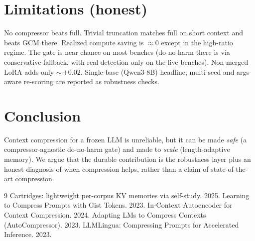 \documentclass[11pt]{article}
\begin{document}
\section{Limitations (honest)}
No compressor beats full. Trivial truncation matches full on short context and beats GCM there. Realized
compute saving is $\approx 0$ except in the high-ratio regime. The gate is near chance on most benches
(do-no-harm there is via conservative fallback, with real detection only on the live benches). Non-merged LoRA
adds only $\sim$\,$+0.02$. Single-base (Qwen3-8B) headline; multi-seed and args-aware re-scoring are reported
as robustness checks.

\section{Conclusion}
Context compression for a frozen LLM is unreliable, but it can be made \emph{safe} (a compressor-agnostic
do-no-harm gate) and made to \emph{scale} (length-adaptive memory). We argue that the durable contribution is
the robustness layer plus an honest diagnosis of when compression helps, rather than a claim of state-of-the-art
compression.

\begin{thebibliography}{9}\small
{} Cartridges: lightweight per-corpus KV memories via self-study. 2025.
 Learning to Compress Prompts with Gist Tokens. 2023.
 In-Context Autoencoder for Context Compression. 2024.
 Adapting LMs to Compress Contexts (AutoCompressor). 2023.
 LLMLingua: Compressing Prompts for Accelerated Inference. 2023.
\end{thebibliography}
\end{document}
